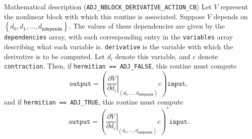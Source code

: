\begin{boxwithtitle}{Mathematical description (\texttt{ADJ_NBLOCK_DERIVATIVE_ACTION_CB})}
Let $V$ represent the nonlinear block with which this routine is associated. 
Suppose $V$ depends on $\left\{d_0, d_1, \dots, d_\texttt{ndepends}\right\}$. The values of these                                                  
dependencies are given by the \texttt{dependencies} array, with each corresponding entry in the \texttt{variables} array describing what each variable is. \texttt{derivative} 
is the variable with which the derivative is to be computed. Let $d_i$ denote this variable, and $c$ denote \texttt{contraction}.
Then, if \texttt{hermitian == ADJ_FALSE}, this routine must compute
\begin{equation*}
\texttt{output} = \left(\left.\frac{\partial V}{\partial d_i}\right|_{(d_0, \dots, d_{\texttt{ndepends}})}c\right)\texttt{input}, 
\end{equation*}
and if \texttt{hermitian == ADJ_TRUE}, this routine must compute
\begin{equation*}
\texttt{output} = \left(\left.\frac{\partial V}{\partial d_i}\right|_{(d_0, \dots, d_{\texttt{ndepends}})}c\right)^{*}\texttt{input}. 
\end{equation*}
\end{boxwithtitle}

